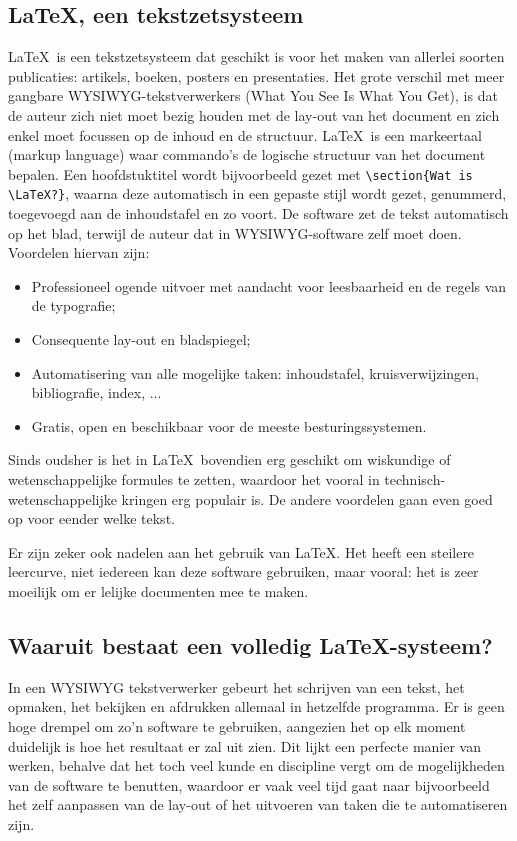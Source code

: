 \documentclass[kulak]{kulakarticle} %
\begin{document}
\subsection{\LaTeX, een tekstzetsysteem}
\LaTeX\ is een tekstzetsysteem dat geschikt is voor het maken van allerlei soorten publicaties: artikels, boeken, posters en presentaties. Het grote verschil met meer gangbare WYSIWYG-tekstverwerkers (What You See Is What You Get), is dat de auteur zich niet moet bezig houden met de lay-out van het document en zich enkel moet focussen op de inhoud en de structuur. \LaTeX\ is een markeertaal (markup language) waar commando's de logische structuur van het document bepalen. Een hoofdstuktitel wordt bijvoorbeeld gezet met \verb+\section{Wat is \LaTeX?}+, waarna deze automatisch in een gepaste stijl wordt gezet, genummerd, toegevoegd aan de inhoudstafel en zo voort. De software zet de tekst automatisch op het blad, terwijl de auteur dat in WYSIWYG-software zelf moet doen. Voordelen hiervan zijn:
\begin{itemize}
\item Professioneel ogende uitvoer met aandacht voor leesbaarheid en de regels van de typografie;
\item Consequente lay-out en bladspiegel;
\item Automatisering van alle mogelijke taken: inhoudstafel, kruisverwijzingen, bibliografie, index, ...
\item Gratis, open en beschikbaar voor de meeste besturingssystemen.
\end{itemize}
Sinds oudsher is het in \LaTeX\ bovendien erg geschikt om wiskundige of wetenschappelijke formules te zetten, waardoor het vooral in technisch-wetenschappelijke kringen erg populair is. De andere voordelen gaan even goed op voor eender welke tekst.

Er zijn zeker ook nadelen aan het gebruik van \LaTeX. Het heeft een steilere leercurve, niet iedereen kan deze software gebruiken, maar vooral: het is zeer moeilijk om er lelijke documenten mee te maken.

\subsection{Waaruit bestaat een volledig \LaTeX-systeem?}
In een WYSIWYG tekstverwerker gebeurt het schrijven van een tekst, het opmaken, het bekijken en afdrukken allemaal in hetzelfde programma. Er is geen hoge drempel om zo'n software te gebruiken, aangezien het op elk moment duidelijk is hoe het resultaat er zal uit zien. Dit lijkt een perfecte manier van werken, behalve dat het toch veel kunde en discipline vergt om de mogelijkheden van de software te benutten, waardoor er vaak veel tijd gaat naar bijvoorbeeld het zelf aanpassen van de lay-out of het uitvoeren van taken die te automatiseren zijn.
\end{document}
